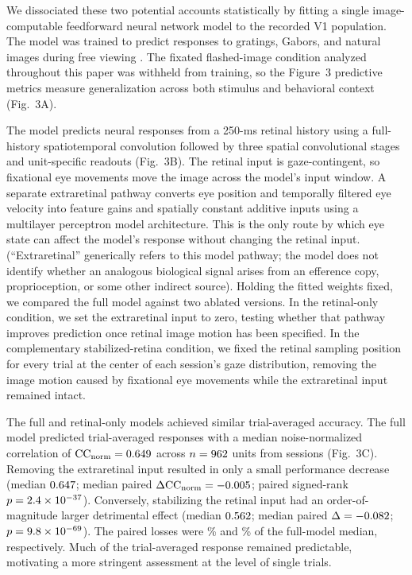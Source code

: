 \documentclass{lite}
\begin{document}
We dissociated these two potential accounts statistically by fitting a single image-computable feedforward neural network model to the recorded V1 population. The model was trained to predict responses to gratings, Gabors, and natural images during free viewing \cite{yates2023detailed}. The fixated flashed-image condition analyzed throughout this paper was withheld from training, so the Figure~3 predictive metrics measure generalization across both stimulus and behavioral context (Fig.~3A).

The model predicts neural responses from a 250-ms retinal history using a full-history spatiotemporal convolution followed by three spatial convolutional stages and unit-specific readouts (Fig.~3B). The retinal input is gaze-contingent, so fixational eye movements move the image across the model's input window. A separate extraretinal pathway converts eye position and temporally filtered eye velocity into feature gains and spatially constant additive inputs using a multilayer perceptron model architecture. This is the only route by which eye state can affect the model's response without changing the retinal input. (``Extraretinal'' generically refers to this model pathway; the model does not identify whether an analogous biological signal arises from an efference copy, proprioception, or some other indirect source). Holding the fitted weights fixed, we compared the full model against two ablated versions. In the retinal-only condition, we set the extraretinal input to zero, testing whether that pathway improves prediction once retinal image motion has been specified. In the complementary stabilized-retina condition, we fixed the retinal sampling position for every trial at the center of each session’s gaze distribution, removing the image motion caused by fixational eye movements while the extraretinal input remained intact.

The full and retinal-only models achieved similar trial-averaged accuracy. The full model predicted trial-averaged responses with a median noise-normalized correlation of $\mathrm{CC}_{\mathrm{norm}} = 0.649$ across $n = 962$ units from \FigThreeSessions{} sessions (Fig.~3C). Removing the extraretinal input resulted in only a small performance decrease (median $0.647$; median paired $\Delta \mathrm{CC}_{\mathrm{norm}} = -0.005$; paired signed-rank $p = 2.4\times10^{-37}$). Conversely, stabilizing the retinal input had an order-of-magnitude larger detrimental effect (median $0.562$; median paired $\Delta = -0.082$; $p = 9.8\times10^{-69}$). The paired losses were \FigThreeCRetinalReduction\% and \FigThreeCStabilizedReduction\% of the full-model median, respectively. Much of the trial-averaged response remained predictable, motivating a more stringent assessment at the level of single trials.
\end{document}
